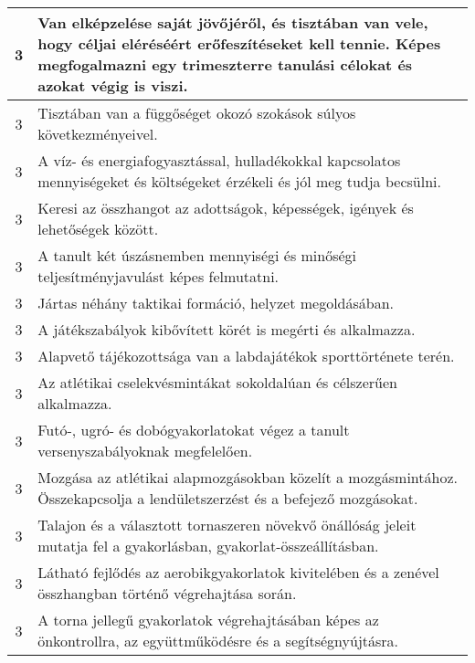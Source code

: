 \begin{longtable}{c | p{12cm} }
                                
                                          3 &  Van elképzelése saját jövőjéről, és tisztában van vele, hogy céljai eléréséért erőfeszítéseket kell tennie. Képes megfogalmazni egy trimeszterre tanulási célokat és azokat végig is viszi. \\ \hline
                                          3 &  Tisztában van a függőséget okozó szokások súlyos következményeivel. \\ \hline
                                          3 &  A víz- és energiafogyasztással, hulladékokkal kapcsolatos mennyiségeket és költségeket érzékeli és jól meg tudja becsülni. \\ \hline
                                          3 &  Keresi az összhangot az adottságok, képességek, igények és lehetőségek között. \\ \hline
                                          3 &  A tanult két úszásnemben mennyiségi és minőségi teljesítményjavulást képes felmutatni. \\ \hline
                                          3 &  Jártas néhány taktikai formáció, helyzet megoldásában. \\ \hline
                                          3 &  A játékszabályok kibővített körét is megérti és alkalmazza. \\ \hline
                                          3 &  Alapvető tájékozottsága van a labdajátékok sporttörténete terén. \\ \hline
                                          3 &  Az atlétikai cselekvésmintákat sokoldalúan és célszerűen alkalmazza. \\ \hline
                                          3 &  Futó-, ugró- és dobógyakorlatokat végez a tanult versenyszabályoknak megfelelően. \\ \hline
                                          3 &  Mozgása az atlétikai alapmozgásokban közelít a mozgásmintához. Összekapcsolja a lendületszerzést és a befejező mozgásokat. \\ \hline
                                          3 &  Talajon és a választott tornaszeren növekvő önállóság jeleit mutatja fel a gyakorlásban, gyakorlat-összeállításban. \\ \hline
                                          3 &  Látható fejlődés az aerobikgyakorlatok kivitelében és a zenével összhangban történő végrehajtása során. \\ \hline
                                          3 &  A torna jellegű gyakorlatok végrehajtásában képes az önkontrollra, az együttműködésre és a segítségnyújtásra. \\ \hline

\end{longtable}
